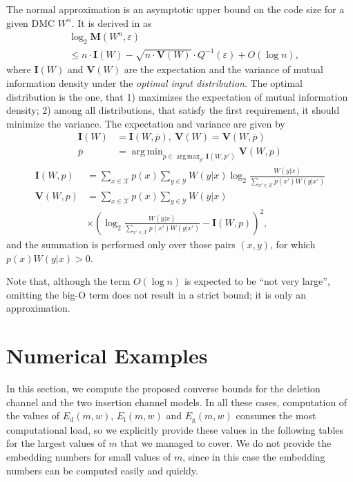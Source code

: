 \documentclass[journal, twocol]{IEEEtran}
\DeclareMathOperator*{\argmin}{arg\,min}
\DeclareMathOperator*{\argmax}{arg\,max}
\newcommand{\Ed}{{E_{\text{d}}}}
\newcommand{\Ei}{{E_{\text{i}}}}
\newcommand{\Eg}{{E_{\text{g}}}}
\newcommand{\op}{{\overline{p}}}
\newcommand{\bfI}{{\mathbf{I}}}
\newcommand{\bfM}{{\mathbf{M}}}
\newcommand{\bfV}{{\mathbf{V}}}
\newcommand{\mX}{{\mathcal{X}}}
\newcommand{\mY}{{\mathcal{Y}}}
\newcommand{\br}[1]{{\left({#1}\right)}}
\newcommand{\ve}{\varepsilon}
\begin{document}
The normal approximation is an asymptotic upper bound on the code size for a given DMC $W^n$.
It is derived in \cite{polyanskiy2010channel} as
\begin{align}
&\log_2\bfM(W^n,\ve) \nonumber\\
&\leq n\cdot\bfI(W)-\sqrt{n\cdot\bfV(W)}\cdot Q^{-1}(\ve)+O(\log n),
\label{eq:napp}
\end{align}
where $\bfI(W)$ and $\bfV(W)$ are the expectation and the variance of mutual information density under the \emph{optimal input distribution}.
The optimal distribution is the one, that 1) maximizes the expectation of mutual information density; 2) among all distributions, that satisfy the first requirement, it should minimize the variance.
The expectation and variance are given by
\begin{align}
\bfI(W)&=\bfI(W,\op),~\bfV(W) = \bfV(W,\op) 
\label{eq:IWVW}
\\
\op&=\argmin_{p \in \argmax_{p'} \bfI(W,p')} \bfV(W,p) 
\label{eq:op}
\end{align}
\begin{align}
\bfI(W,p)&=\sum_{x\in\mX}p(x)\sum_{y\in\mY}W(y|x)\log_2\frac{W(y|x)}{\sum_{x'\in\mX}p(x')W(y|x')}
\label{eq:IWp}
\\
\bfV(W,p)&=\sum_{x\in\mX}p(x)\sum_{y\in\mY}W(y|x)
\nonumber\\
&\times\br{\log_2\frac{W(y|x)}{\sum_{x'\in\mX}p(x')W(y|x')}-\bfI(W,p)}^2,
\label{eq:VWp}
\end{align}
and the summation is performed only over those pairs $(x,y)$, for which $p(x)W(y|x) > 0$.

Note that, although the term $O(\log n)$ is expected to be ``not very large'', omitting the big-O term does not result in a strict bound; it is only an approximation. 

\section{Numerical Examples}
\label{s:num}

In this section, we compute the proposed converse bounds for the deletion channel and the two insertion channel models. In all these cases, computation of the values of $\Ed(m,w)$, $\Ei(m,w)$ and $\Eg(m,w)$ consumes the most computational load, so we explicitly provide these values in the following tables for the largest values of $m$ that we managed to cover.
We do not provide the embedding numbers for small values of $m$, since in this case the embedding numbers can be computed easily and quickly.
\end{document}
